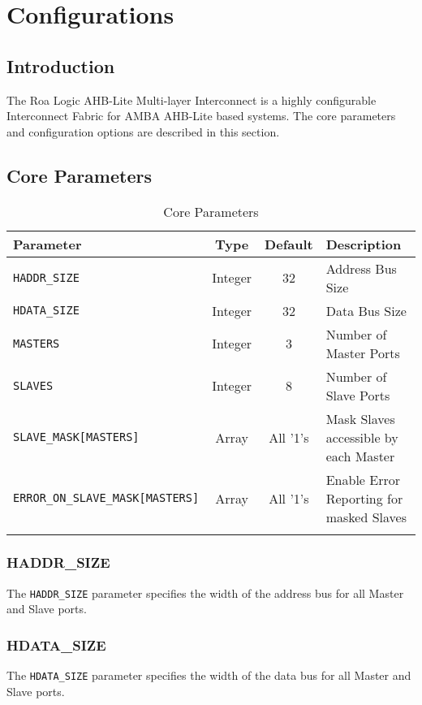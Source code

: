 \chapter{Configurations}\label{configurations}


\section{Introduction}\label{introduction-1}


The Roa Logic AHB-Lite Multi-layer Interconnect is a highly configurable
Interconnect Fabric for AMBA AHB-Lite based systems. The core parameters
and configuration options are described in this section.

\section{Core Parameters}\label{core-parameters}

\begin{longtable}[]{@{}lccp{5cm}@{}}
\toprule
Parameter & Type & Default & Description\tabularnewline
\midrule
\endhead
\texttt{HADDR\_SIZE}           & Integer & 32     & Address Bus Size\tabularnewline
\texttt{HDATA\_SIZE}           & Integer & 32     & Data Bus Size\tabularnewline
\texttt{MASTERS}               & Integer & 3      & Number of Master Ports\tabularnewline
\texttt{SLAVES}                & Integer & 8      & Number of Slave Ports\tabularnewline
\texttt{SLAVE\_MASK[MASTERS]}  & Array  & All '1's & Mask Slaves accessible by each Master\tabularnewline
\texttt{ERROR\_ON\_SLAVE\_MASK[MASTERS]} & Array & All '1's & Enable Error Reporting for masked Slaves\tabularnewline

\bottomrule
\caption{Core Parameters}
\end{longtable}

\subsection{HADDR\_SIZE}\label{haddr_size}

The \texttt{HADDR\_SIZE} parameter specifies the width of the address bus for all
Master and Slave ports.

\subsection{HDATA\_SIZE}\label{hdata_size}

The \texttt{HDATA\_SIZE} parameter specifies the width of the data bus for all
Master and Slave ports.

